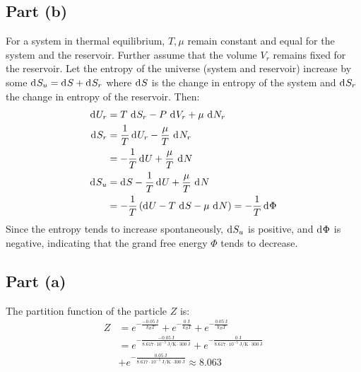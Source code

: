 \documentclass{article}
\begin{document}
\subsection*{Part (b)}
For a system in thermal equilibrium, $T, \mu$ remain constant and equal for the system and the reservoir. Further assume that the volume $V_r$ remains fixed for the reservoir. Let the entropy of the universe (system and reservoir) increase by some $\diff{S}_{u} = \diff{S} + \diff{S}_r$ where $\diff{S}$ is the change in entropy of the system and $\diff{S}_r$ the change in entropy of the reservoir. Then:
\begin{equation}
    \begin{split}
        \diff{U}_r & = T \, \diff{S}_r - P \, \diff{V}_r + \mu \, \diff{N}_r  \\
        \diff{S}_r & = \frac{1}{T}\diff{U}_r - \frac{\mu}{T} \, \diff{N}_r \\
        & = -\frac{1}{T}\diff{U} + \frac{\mu}{T} \, \diff{N} \\
        \diff{S}_u & = \diff{S} -\frac{1}{T}\diff{U} + \frac{\mu}{T} \, \diff{N} \\
        & = -\frac{1}{T}\left(\diff{U} - T \, \diff{S} - \mu \, \diff{N}\right) = -\frac{1}{T}\diff{\Phi}
    \end{split}
\end{equation}
Since the entropy tends to increase spontaneously, $\diff{S}_u$ is positive, and $\diff{\Phi}$ is negative, indicating that the grand free energy $\Phi$ tends to decrease.

\clearpage

\subsection*{Part (a)}
The partition function of the particle $Z$ is:
\begin{equation}
    \begin{split}
        Z & = e^{-\frac{-0.05~\unit{\joule}}{k_BT}} + e^{-\frac{0~\unit{\joule}}{k_BT}} + e^{-\frac{0.05~\unit{\joule}}{k_BT}} \\
        & = e^{-\frac{-0.05~\unit{\joule}}{8.617 \cdot 10^{-5}~\unit{\joule\per\kelvin} \cdot 300~\unit{\joule}}} + e^{-\frac{0~\unit{\joule}}{8.617 \cdot 10^{-5}~\unit{\joule\per\kelvin} \cdot 300~\unit{\joule}}} \\
        & + e^{-\frac{0.05~\unit{\joule}}{8.617 \cdot 10^{-5}~\unit{\joule\per\kelvin} \cdot 300~\unit{\joule}}} \approx 8.063 \\
    \end{split}
\end{equation}
\end{document}
